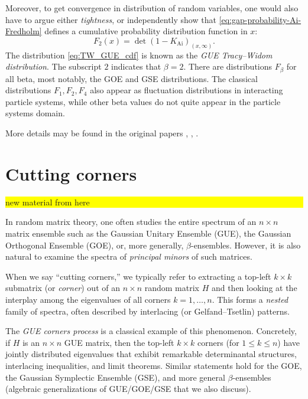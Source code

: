 \documentclass[letterpaper,11pt,oneside,reqno]{article}
\numberwithin{equation}{section}
\theoremstyle{definition}
\begin{document}
Moreover, to get convergence in distribution of random variables,
one would also have to argue either \emph{tightness},
or independently show that
\eqref{eq:gap-probability-Ai-Fredholm} defines a
cumulative probability
distribution function in $x$:
\begin{equation}
	\label{eq:TW_GUE_cdf}
	F_2(x)=\det\left( 1-K_{\mathrm{Ai}} \right)_{(x,\infty)}.
\end{equation}
The distribution \eqref{eq:TW_GUE_cdf} is known as the \emph{GUE Tracy--Widom distribution}.
The subscript $2$ indicates that $\beta=2$. There are distributions
$F_\beta$ for all beta, most notably, the GOE and GSE distributions.
The classical distributions $F_1,F_2,F_4$ also appear as fluctuation distributions
in interacting particle systems, while other beta values do
not quite appear in the particle systems
domain.

More details
may be found in the original papers
\cite{tracy1993level},
\cite{Forrester1993},
\cite{tracy_widom1994level_airy}.





\section{Cutting corners}







\colorbox{yellow}{\parbox{.7\textwidth}{new material from here}}


In random matrix theory, one often studies the entire spectrum of an $n\times n$ matrix ensemble such as the Gaussian Unitary Ensemble (GUE), the Gaussian Orthogonal Ensemble (GOE), or, more generally, $\beta$-ensembles. However, it is also natural to examine the spectra of \emph{principal minors} of such matrices.

When we say ``cutting corners,'' we typically refer to extracting a top-left $k\times k$ submatrix (or \emph{corner}) out of an $n\times n$ random matrix $H$ and then looking at the interplay among the eigenvalues of all corners $k=1,\dots,n$. This forms a \emph{nested} family of spectra, often described by interlacing (or Gelfand--Tsetlin) patterns.

The \emph{GUE corners process} is a classical example of this phenomenon. Concretely, if $H$ is an $n\times n$ GUE matrix, then the top-left $k\times k$ corners (for $1\le k\le n$) have jointly distributed eigenvalues that exhibit remarkable determinantal structures, interlacing inequalities, and limit theorems. Similar statements hold for the GOE, the Gaussian Symplectic Ensemble (GSE), and more general $\beta$-ensembles (algebraic generalizations of GUE/GOE/GSE that we also discuss).
\end{document}
